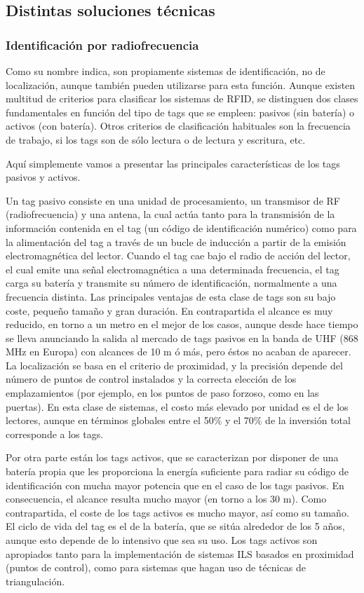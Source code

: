 \subsection{Distintas soluciones técnicas}

\subsubsection{Identificación por radiofrecuencia}

Como su nombre indica, son propiamente sistemas de identificación, no de localización, aunque también pueden utilizarse para esta función. Aunque existen multitud de criterios para clasificar los sistemas de RFID, se distinguen dos clases fundamentales en función del tipo de tags que se empleen: pasivos (sin batería) o activos (con batería). Otros criterios de clasificación habituales son la frecuencia de trabajo, si los tags son de sólo lectura o de lectura y escritura, etc. 

Aquí simplemente vamos a presentar las principales características de los tags pasivos y activos. 

Un tag pasivo consiste en una unidad de procesamiento, un transmisor de RF (radiofrecuencia)
y una antena, la cual actúa tanto para la transmisión de la información contenida en el tag (un código de identificación
numérico) como para la alimentación del tag a través de un bucle de inducción a partir de la emisión electromagnética del lector. Cuando el tag cae bajo el radio de acción del lector, el cual emite una señal electromagnética a una determinada frecuencia, el tag carga su batería y transmite su número de identificación, normalmente a una frecuencia distinta. Las principales ventajas de esta clase de tags son su bajo coste, pequeño tamaño y gran duración. En contrapartida el alcance es muy reducido, en torno a un metro en el mejor de los casos, aunque desde hace tiempo se lleva anunciando la salida al mercado de tags pasivos en la banda de UHF (868 MHz en Europa) con alcances de 10 m ó más, pero éstos no acaban de aparecer. La localización se basa en el criterio de proximidad, y la precisión depende del número de puntos de control instalados y la correcta elección de los emplazamientos (por ejemplo, en los puntos de paso forzoso, como en las puertas). En esta clase de sistemas, el costo más elevado por unidad es el de los lectores, aunque en términos globales entre el 50\% y el 70\% de la inversión total corresponde a los tags. 

Por otra parte están los tags activos, que se caracterizan por disponer de una batería propia que les proporciona la energía suficiente para radiar su código de identificación con mucha mayor potencia que en el caso de los tags pasivos. En consecuencia, el alcance resulta mucho mayor (en torno a los 30 m). Como contrapartida, el coste de los tags activos es mucho mayor, así como su tamaño. El ciclo de vida del tag es el de la batería, que se sitúa alrededor de los 5 años, aunque esto depende de lo intensivo que sea su uso. Los tags activos son apropiados tanto para la implementación de sistemas ILS basados en proximidad (puntos de control), como para sistemas que hagan uso de técnicas de triangulación. 

